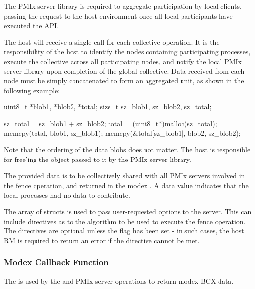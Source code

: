 \adviceimplstart
The \ac{PMIx} server library is required to aggregate participation by local clients, passing the request to the host environment once all local participants have executed the \ac{API}.
\adviceimplend

\advicermstart
The host will receive a single call for each collective operation. It is the responsibility of the host to identify the nodes containing participating processes, execute the collective across all participating nodes, and notify the local \ac{PMIx} server library upon completion of the global collective. Data received from each node must be simply concatenated to form an aggregated unit, as shown in the following example:

\cspecificstart
\begin{codepar}
uint8_t *blob1, *blob2, *total;
size_t sz_blob1, sz_blob2, sz_total;

sz_total = sz_blob1 + sz_blob2;
total = (uint8_t*)malloc(sz_total);
memcpy(total, blob1, sz_blob1);
memcpy(\&total[sz_blob1], blob2, sz_blob2);
\end{codepar}
\cspecificend

Note that the ordering of the data blobs does not matter. The host is responsible for free'ing the  object passed to it by the \ac{PMIx} server library.
\advicermend

The provided data is to be collectively shared with all \ac{PMIx} servers involved in the fence operation, and returned in the modex .
A  data value indicates that the local processes had no data to contribute.

The array of  structs is used to pass user-requested options to the server.
This can include directives as to the algorithm to be used to execute the fence operation.
The directives are optional unless the  flag has been set - in such cases, the host \ac{RM} is required to return an error if the directive cannot be met.

\subsubsection{Modex Callback Function}

\summary

The  is used by the  and  PMIx server operations to return modex \ac{BCX} data.

